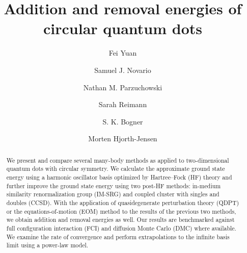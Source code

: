 
\usepackage{amsmath}
\usepackage{amssymb}
\usepackage{bm}
\usepackage{color}
\usepackage{graphicx}
\usepackage{hyperref}
\usepackage{natbib}
\usepackage{scalerel}
\usepackage{siunitx}

\newcommand{\D}{\operatorname{d\!}}
\newcommand{\E}{\operatorname{e}}
\newcommand{\bra}[1]{\langle #1 |}
\newcommand{\braket}[2]{\langle #1 | #2\rangle}
\newcommand{\ket}[1]{| #1 \rangle}
\newcommand{\normord}[1]{\mathopen: #1 \mathclose:}
\newcommand{\antisymm}{\mathop{\scalerel*{\mathcal{A}}{\textstyle\sum}}\displaylimits}


\title{Addition and removal energies of circular quantum dots}

\author{Fei Yuan}
\author{Samuel J. Novario}
\author{Nathan M. Parzuchowski}
\author{Sarah Reimann}
\author{S. K. Bogner}
\author{Morten Hjorth-Jensen}

\begin{abstract}
  We present and compare several many-body methods as applied to two-dimensional quantum dots with circular symmetry.  We calculate the approximate ground state energy using a harmonic oscillator basis optimized by Hartree--Fock (HF) theory and further improve the ground state energy using two post-HF methods: in-medium similarity renormalization group (IM-SRG) and coupled cluster with singles and doubles (CCSD).  With the application of quasidegenerate perturbation theory (QDPT) or the equations-of-motion (EOM) method to the results of the previous two methods, we obtain addition and removal energies as well.  Our results are benchmarked against full configuration interaction (FCI) and diffusion Monte Carlo (DMC) where available.  We examine the rate of convergence and perform extrapolations to the infinite basis limit using a power-law model.
\end{abstract}

